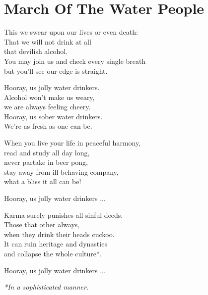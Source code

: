 \section{March Of The Water People}

This we swear upon our lives or even death:\\
That we will not drink at all\\
that devilish alcohol.\\
You may join us and check every single breath\\
but you'll see our edge is straight.

Hooray, us jolly water drinkers.\\
Alcohol won't make us weary,\\
we are always feeling cheery.\\
Hooray, us sober water drinkers.\\
We're as fresh as one can be.

When you live your life in peaceful harmony,\\
read and study all day long,\\
never partake in beer pong,\\
stay away from ill-behaving company,\\
what a bliss it all can be!

Hooray, us jolly water drinkers ...

Karma surely punishes all sinful deeds.\\
Those that other always,\\
when they drink their heads cuckoo.\\
It can ruin heritage and dynasties\\
and collapse the whole culture*.

Hooray, us jolly water drinkers ...

\textit{*In a sophisticated manner.}